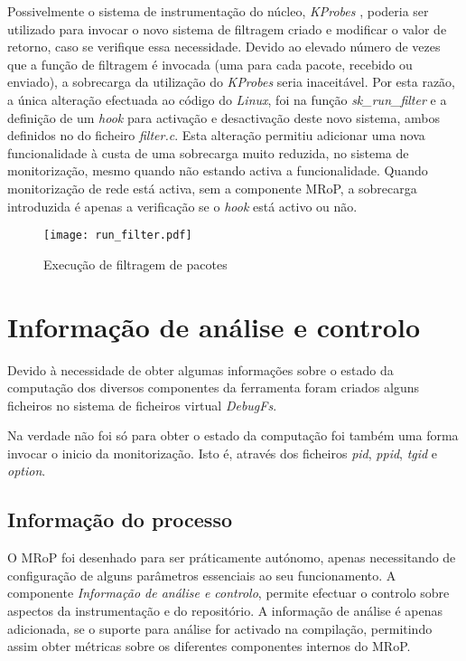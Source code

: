 Possivelmente o sistema de instrumentação do núcleo, \textit{KProbes} , poderia ser utilizado para invocar o novo sistema de filtragem criado e modificar o valor de retorno, caso se verifique essa necessidade.
Devido ao elevado número de vezes que a função de filtragem é invocada (uma para cada pacote, recebido ou enviado), a sobrecarga da utilização do \textit{KProbes} seria inaceitável.
Por esta razão, a única alteração efectuada ao código do \textit{Linux}, foi na função \textit{sk\_run\_filter} e a definição de um \textit{hook} para activação e desactivação deste novo sistema, ambos definidos no do ficheiro \textit{filter.c}.
Esta alteração permitiu adicionar uma nova funcionalidade à custa de uma sobrecarga muito reduzida, no sistema de monitorização, mesmo quando não estando activa a funcionalidade.
Quando monitorização de rede está activa, sem a componente MRoP, a sobrecarga introduzida é apenas a verificação se o \textit{hook} está activo ou não.

\begin{figure}[ht]
\centering
\texttt{[image: run\_filter.pdf]}
\caption{Execução de filtragem de pacotes}
\label{fig:run_filter}
\end{figure}


\section{Informação de análise e controlo}

Devido à necessidade de obter algumas informações sobre o estado da computação dos diversos componentes da ferramenta foram criados alguns ficheiros no
sistema de ficheiros virtual \textit{DebugFs}.

Na verdade não foi só para obter o estado da computação foi também uma forma invocar o inicio da monitorização.
 Isto é, através dos ficheiros \textit{pid}, \textit{ppid}, \textit{tgid} e \textit{option}. 

\subsection{Informação do processo}


O MRoP foi desenhado para ser práticamente autónomo, apenas necessitando de configuração de alguns parâmetros essenciais ao seu funcionamento.
A componente \textit{Informação de análise e controlo}, permite efectuar o controlo sobre aspectos da instrumentação e do repositório.
A informação de análise é apenas adicionada, se o suporte para análise for activado na compilação, permitindo assim obter métricas sobre os diferentes componentes internos do MRoP.

